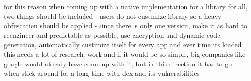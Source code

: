 for this reason when coming up with a native implementation for a library for all, two things should be included
- users do not custimize library so a heavy obfuscation should be applied
- since there is only one version, make it as hard to reengineer and predictable as possible, use encryption and dynamic code generation, automatically custimize itself for every app and ever time its loaded
this needs a lot of research, work and if it would be so simple, big companies like google would already have come up with it, but in this direction it has to go when stick around for a long time with dex and its vulnerabilities
